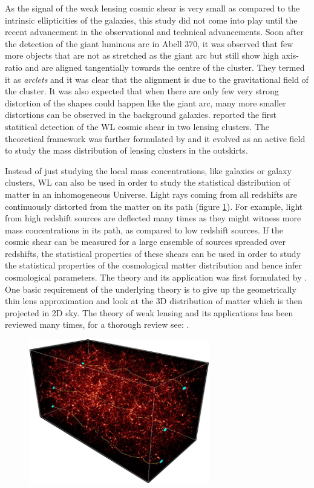 As the signal of the weak lensing cosmic shear is very small as compared to the 
intrinsic ellipticities of the galaxies, this study did not come into play until
the recent advancement in the observational and technical advancements. Soon 
after the detection of the giant luminous arc in Abell 370, it was observed
that few more objects that are not as stretched as the giant arc but still show
high axis-ratio and are aligned tangentially towards the centre of the cluster. They
termed it as {\it arclets} and it was clear that the alignment is due to the 
gravitational field of the cluster. It was also expected that when there are
only few very strong distortion of the shapes could happen like the giant 
arc, many more smaller distortions can be observed in the background galaxies.
\cite{1990ApJ...349L...1T} reported the first statitical detection of the WL
cosmic shear in two lensing clusters. The theoretical framework was further
formulated by \cite{1993ApJ...404..441K} and it evolved as an active field
to study the mass distribution of lensing clusters in the outskirts. 

Instead of just studying the local mass concentrations, like galaxies or galaxy
clusters, WL can also be used in order to study the statistical distribution of matter
in an inhomogeneous Universe. Light rays coming from all redshifts are continuously
distorted from the matter on its path (figure \ref{fig:wl}). 
For example, light from high redshift sources
are deflected many times as they might witness more mass concentrations in its path, 
as compared to low redshift sources. If the cosmic shear can be measured for 
a large ensemble of sources spreaded over redshifts, the statistical properties
of these shears can be used in order to study the statistical properties of the
cosmological matter distribution and hence infer cosmological parameters. The 
theory and its application was first formulated by \cite{1991MNRAS.251..600B}.
One basic requirement of the underlying theory is to give up the geometrically
thin lens approximation and look at the 3D distribution of matter which 
is then projected in 2D sky. The theory of weak lensing and its applications
has been reviewed many times, for a thorough review see: \cite{}.

\begin{figure}
	\centering
	\includegraphics[width=0.7\textwidth]{figures/weaklensing.png}
	\caption{}
	\label{fig:wl}
\end{figure}

